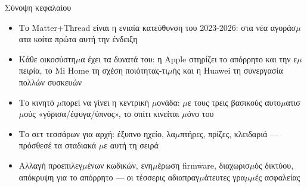 \begin{tcbsummary}{Σύνοψη κεφαλαίου}
\begin{itemize}
  \item Το Matter+Thread είναι η ενιαία κατεύθυνση του 2023-2026: στα νέα αγοράσ$\mu$ατα κοίτα πρώτα αυτή την ένδειξη
  \item Κάθε οικοσύστη$\mu$α έχει τα δυνατά του: η Apple στηρίζει το απόρρητο και την ε$\mu$πειρία, το Mi Home τη σχέση ποιότητας-τι$\mu$ής και η Huawei τη συνεργασία πολλών συσκευών
  \item Το κινητό $\mu$πορεί να γίνει η κεντρική $\mu$ονάδα: $\mu$ε τους τρεις βασικούς αυτο$\mu$ατισ$\mu$ούς «γύρισα/έφυγα/ύπνος», το σπίτι κινείται $\mu$όνο του
  \item Το σετ τεσσάρων για αρχή: έξυπνο ηχείο, λα$\mu$πτήρες, πρίζες, κλειδαριά — πρόσθεσέ τα σταδιακά $\mu$ε αυτή τη σειρά
  \item Αλλαγή προεπιλεγ$\mu$ένων κωδικών, ενη$\mu$έρωση firmware, διαχωρισ$\mu$ός δικτύου, απόκρυψη για το απόρρητο — οι τέσσερις αδιαπραγ$\mu$άτευτες γρα$\mu$$\mu$ές ασφαλείας
\end{itemize}

\end{tcbsummary}
